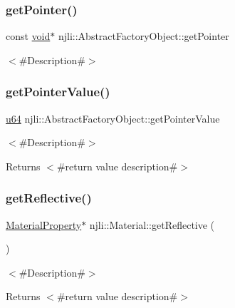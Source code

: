 \subsubsection{\texorpdfstring{get\+Pointer()}{getPointer()}}
{\footnotesize\ttfamily const \mbox{\hyperlink{_thread_8h_af1e856da2e658414cb2456cb6f7ebc66}{void}}$\ast$ njli\+::\+Abstract\+Factory\+Object\+::get\+Pointer}

$<$\#\+Description\#$>$ \mbox{\label{classnjli_1_1_material_a4ffddf141a426a5a07d0ac19f1913811}} 
\subsubsection{\texorpdfstring{get\+Pointer\+Value()}{getPointerValue()}}
{\footnotesize\ttfamily \mbox{\hyperlink{_util_8h_ad758b7a5c3f18ed79d2fcd23d9f16357}{u64}} njli\+::\+Abstract\+Factory\+Object\+::get\+Pointer\+Value}

$<$\#\+Description\#$>$

\begin{DoxyReturn}{Returns}
$<$\#return value description\#$>$ 
\end{DoxyReturn}
\mbox{\label{classnjli_1_1_material_a33a6626c6e0311e027eece10bb9c92fc}} 
\subsubsection{\texorpdfstring{get\+Reflective()}{getReflective()}\hspace{0.1cm}{\footnotesize\ttfamily [1/2]}}
{\footnotesize\ttfamily \mbox{\hyperlink{classnjli_1_1_material_property}{Material\+Property}}$\ast$ njli\+::\+Material\+::get\+Reflective (\begin{DoxyParamCaption}{ }\end{DoxyParamCaption})}

$<$\#\+Description\#$>$

\begin{DoxyReturn}{Returns}
$<$\#return value description\#$>$ 
\end{DoxyReturn}
\mbox{\label{classnjli_1_1_material_aec631cd6781121b6b5a44cbcf73dc122}} 
